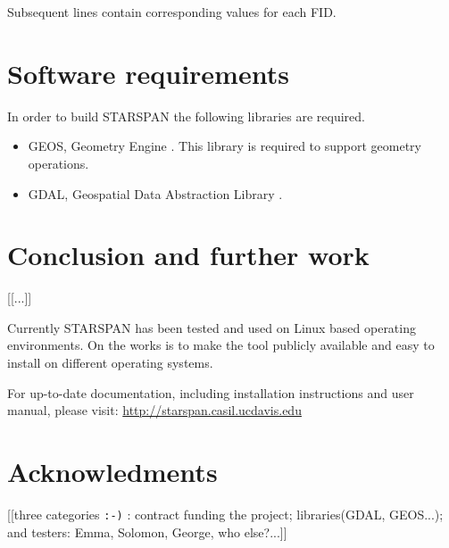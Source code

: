 \documentclass{elsart}
\begin{document}
Subsequent lines contain corresponding values for each FID.

\section{Software requirements}

	In order to build STARSPAN the following libraries are required.
	
	\begin{itemize}
		\item GEOS, Geometry Engine \citep{geos}.
				This library is required to support geometry operations.
				
		\item GDAL, Geospatial Data Abstraction Library \citep{gdal}.
	\end{itemize}



\section{Conclusion and further work}

	[[...]]
	
	Currently STARSPAN has been tested and used on Linux based operating
	environments. On the works is to make the tool publicly available and easy
	to install on different operating systems.


	For up-to-date documentation, including installation instructions and user
	manual, please visit: \url{http://starspan.casil.ucdavis.edu}

\section*{Acknowledments}

	[[three categories \verb|:-)| :
		contract funding the project;
		libraries(GDAL, GEOS...);
		and testers: Emma, Solomon, George, who else?...]]




	


\end{document}
